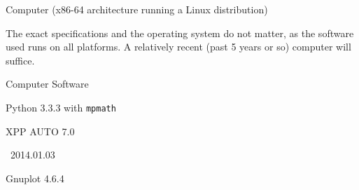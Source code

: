 \startitemize[1,joinedup]

  \startitem Computer (x86-64 architecture running a Linux distribution)

    \indenting[no] The exact specifications and the operating system do not
    matter, as the software used runs on all platforms. A relatively recent
    (past 5 years or so) computer will suffice.
  \stopitem

  \startitem Computer Software
    \startitemize[1,joinedup]
    \item Python 3.3.3 with {\tt mpmath}
    \item XPP AUTO 7.0
    \item \CONTEXT \ 2014.01.03
    \item Gnuplot 4.6.4
    \stopitemize
  \stopitem
\stopitemize
